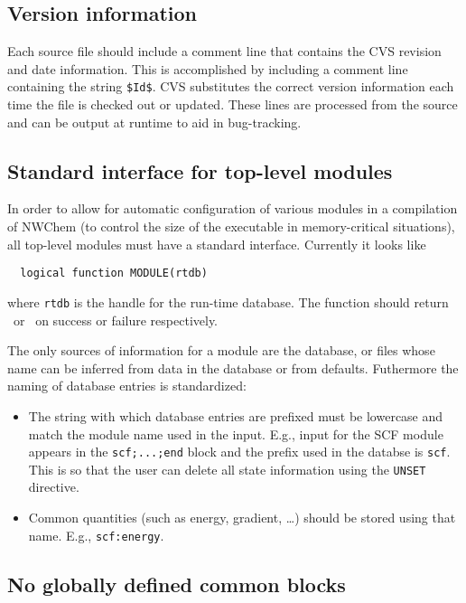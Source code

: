 \subsection{Version information}

Each source file should include a comment line that contains the CVS
revision and date information.  This is accomplished by including a
comment line containing the string \verb+$+\verb+Id+\verb+$+.  CVS
substitutes the correct version information each time the file is
checked out or updated.  These lines are processed from the source and can be
output at runtime to aid in bug-tracking.

\subsection{Standard interface for top-level modules}

In order to allow for automatic configuration of various modules in
a compilation of NWChem (to control the size of the executable
in memory-critical situations), all top-level modules must have a
standard interface.  Currently it looks like
\begin{verbatim}
  logical function MODULE(rtdb)
\end{verbatim}
where \verb+rtdb+ is the handle for the run-time database.  The
function should return \TRUE\ or \FALSE\ on success or failure
respectively.

The only sources of information for a module are the database, or files
whose name can be inferred from data in the database or from defaults.
Futhermore the naming of database entries is standardized:
\begin{itemize}
\item The string with which database entries are prefixed must be
  lowercase and match the module name used in the input.  E.g., input
  for the SCF module appears in the \verb+scf;...;end+ block and the
  prefix used in the databse is \verb+scf+.  This is so that the user
  can delete all state information using the \verb+UNSET+ directive.
\item Common quantities (such as energy, gradient, \ldots) should be
  stored using that name.  E.g., \verb+scf:energy+.
\end{itemize}


\subsection{No globally defined common blocks}

